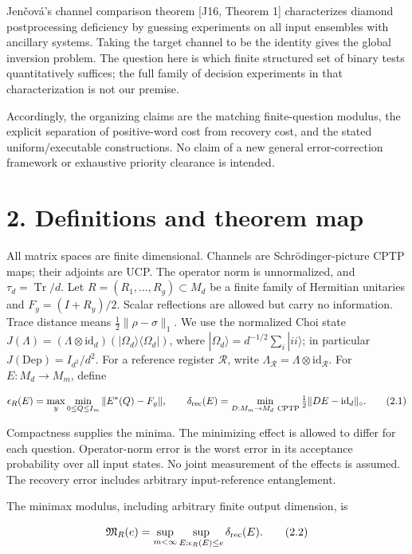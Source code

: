 \documentclass[11pt]{article}
\begin{document}
Jenčová's channel comparison theorem [J16, Theorem 1] characterizes diamond
postprocessing deficiency by guessing experiments on all input ensembles
with ancillary systems. Taking the target channel to be the identity gives
the global inversion problem. The question here is which finite structured
set of binary tests quantitatively suffices; the full family of decision
experiments in that characterization is not our premise.

Accordingly, the organizing claims are the matching finite-question modulus,
the explicit separation of positive-word cost from recovery cost, and the
stated uniform/executable constructions. No claim of a new general
error-correction framework or exhaustive priority clearance is intended.

\section*{2. Definitions and theorem map}

All matrix spaces are finite dimensional. Channels are Schrödinger-picture
CPTP maps; their adjoints are UCP. The operator norm is unnormalized, and
\(\tau_d=\operatorname{Tr}/d\). Let
\(R=(R_1,\ldots,R_g)\subset M_d\) be a finite family of Hermitian unitaries and
\(F_y=(I+R_y)/2\). Scalar reflections are allowed but carry no information.
Trace distance means \(\tfrac12\|\rho-\sigma\|_1\). We use the normalized
Choi state \(J(\Lambda)=(\Lambda\otimes\mathrm{id}_d)
(|\Omega_d\rangle\langle\Omega_d|)\), where
\(|\Omega_d\rangle=d^{-1/2}\sum_i|ii\rangle\); in particular
\(J(\mathrm{Dep})=I_{d^2}/d^2\). For a reference register \(\mathcal R\),
write \(\Lambda_{\mathcal R}=\Lambda\otimes\mathrm{id}_{\mathcal R}\).
For \(E:M_d\to M_m\), define

\[
\epsilon_R(E)=\max_y\min_{0\le Q\le I_m}\|E^*(Q)-F_y\|,
\qquad
\delta_{\rm rec}(E)=\min_{D:M_m\to M_d\ \mathrm{CPTP}}
\tfrac12\|DE-\mathrm{id}_d\|_\diamond.
\tag{2.1}
\]

Compactness supplies the minima. The minimizing effect is allowed to differ
for each question. Operator-norm error is the worst error in its acceptance
probability over all input states. No joint measurement of the effects is
assumed. The recovery error includes arbitrary input-reference entanglement.

The minimax modulus, including arbitrary finite output dimension, is

\[
\mathfrak M_R(e)=\sup_{m<\infty}\sup_{E:\epsilon_R(E)\le e}
\delta_{\rm rec}(E).
\tag{2.2}
\]
\end{document}
